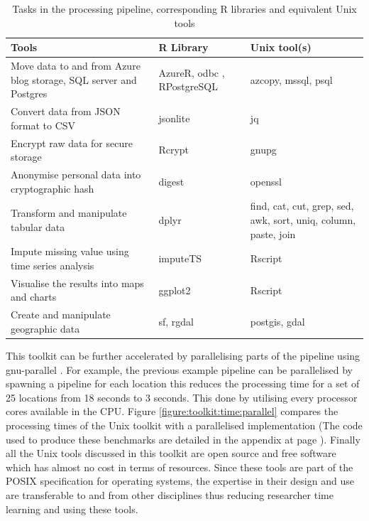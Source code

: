 \begin{table}[h]
  \footnotesize
  \begin{center}
    \begin{tabular}{p{4cm}p{3cm}p{3cm}}
      \toprule
      Tools & R Library & Unix tool(s)\\
      \midrule
        Move data to and from Azure blog storage, SQL server and Postgres & AzureR, odbc , RPostgreSQL & azcopy, mssql, psql\\
				Convert data from JSON format to CSV & jsonlite & jq\\
        \addlinespace[0.2cm]
				Encrypt raw data for secure storage & Rcrypt & gnupg\\
        \addlinespace[0.2cm]
				Anonymise personal data into cryptographic hash & digest & openssl\\
        \addlinespace[0.2cm]
				Transform and manipulate tabular data& dplyr & find, cat, cut, grep, sed, awk, sort, uniq, column, paste, join\\
        \addlinespace[0.2cm]
				Impute missing value using time series analysis & imputeTS & Rscript\\
        \addlinespace[0.2cm]
				Visualise the results into maps and charts & ggplot2 & Rscript\\
        \addlinespace[0.2cm]
        Create and manipulate geographic data & sf, rgdal & postgis, gdal\\
      \bottomrule
    \end{tabular}
  \end{center}
  \caption{Tasks in the processing pipeline, corresponding R libraries and equivalent Unix tools}
  \label{table:toolkit:tools}
\end{table}

This toolkit can be further accelerated by parallelising parts of the pipeline using gnu-parallel \cite[-5cm]{tange2018parallel}.
For example, the previous example pipeline can be parallelised by spawning a pipeline for each location this reduces the processing time for a set of 25 locations from 18 seconds to 3 seconds.
This done by utilising every processor cores available in the CPU.
Figure \ref{figure:toolkit:time:parallel} compares the processing times of the Unix toolkit with a parallelised implementation (The code used to produce these benchmarks are detailed in the appendix at page \pageref{appendix:benchmark}).
Finally all the Unix tools discussed in this toolkit are open source and free software which has almost no cost in terms of resources.
Since these tools are part of the POSIX specification \cite[-5.5cm]{walli1995posix} for operating systems, the expertise in their design and use are transferable to and from other disciplines thus reducing researcher time learning and using these tools.

